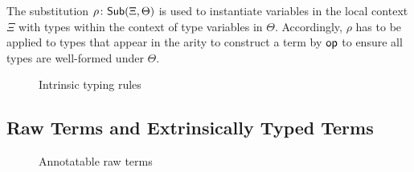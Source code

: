 \documentclass[acmsmall,screen]{acmart}
\theoremstyle{acmdefinition}
\begin{document}
The substitution $\rho\colon \mathsf{Sub}(\Xi, \Theta)$ is used to instantiate variables in the local context $\Xi$ with types within the context of type variables in $\Theta$.
Accordingly, $\rho$ has to be applied to types that appear in the arity to construct a term by $\mathsf{op}$ to ensure all types are well-formed under $\Theta$.

\begin{figure}
  \centering
  \small
  \caption{Intrinsic typing rules}
  \label{fig:intrinsic-typing}
\end{figure}

\subsection{Raw Terms and Extrinsically Typed Terms}

\begin{figure}
  \centering
  \small
  \caption{Annotatable raw terms}
\end{figure}
\end{document}
